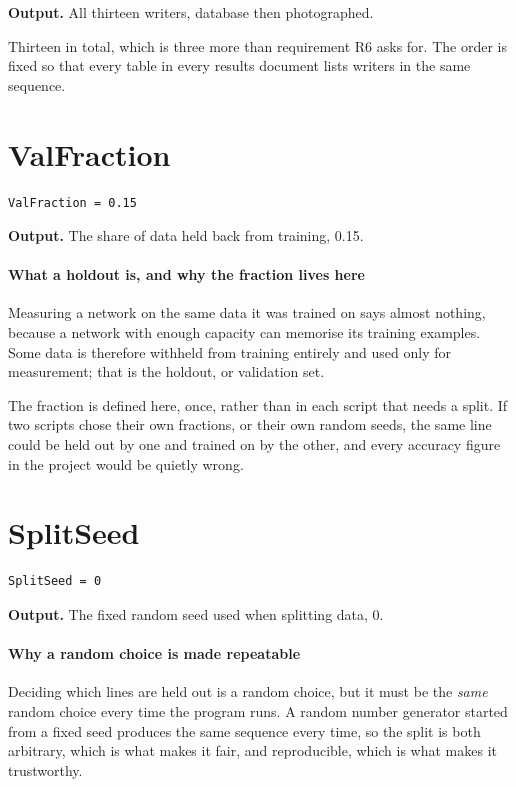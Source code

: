 \noindent\textbf{Output.} All thirteen writers, database then photographed.

Thirteen in total, which is three more than requirement R6 asks for. The order is fixed so that every table in every results document lists writers in the same sequence.


\section{ValFraction}
\begin{lstlisting}[style=sig]
ValFraction = 0.15
\end{lstlisting}

\noindent\textbf{Output.} The share of data held back from training, 0.15.


\paragraph{What a holdout is, and why the fraction lives here}
Measuring a network on the same data it was trained on says almost nothing, because a network with enough capacity can memorise its training examples. Some data is therefore withheld from training entirely and used only for measurement; that is the holdout, or validation set.

The fraction is defined here, once, rather than in each script that needs a split. If two scripts chose their own fractions, or their own random seeds, the same line could be held out by one and trained on by the other, and every accuracy figure in the project would be quietly wrong.


\section{SplitSeed}
\begin{lstlisting}[style=sig]
SplitSeed = 0
\end{lstlisting}

\noindent\textbf{Output.} The fixed random seed used when splitting data, 0.


\paragraph{Why a random choice is made repeatable}
Deciding which lines are held out is a random choice, but it must be the \emph{same} random choice every time the program runs. A random number generator started from a fixed seed produces the same sequence every time, so the split is both arbitrary, which is what makes it fair, and reproducible, which is what makes it trustworthy.


